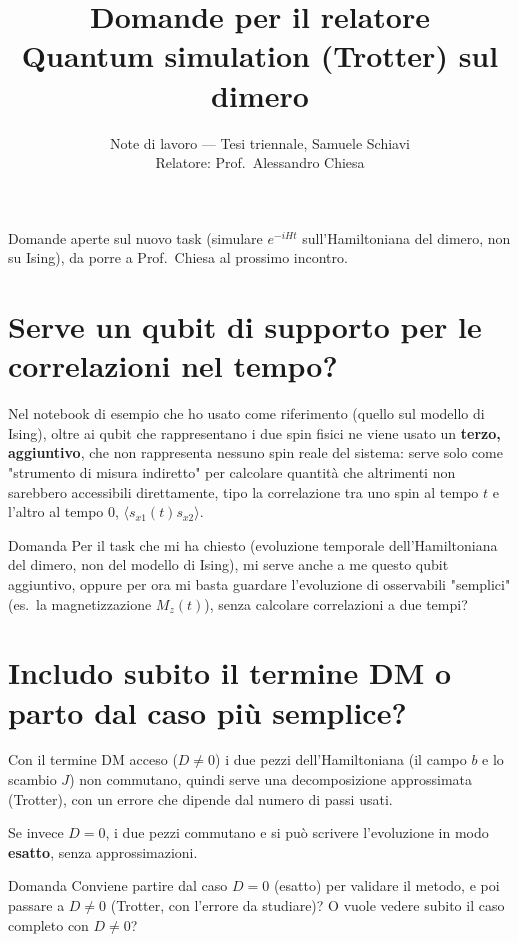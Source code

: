 \documentclass[11pt,a4paper]{article}
\title{\vspace{-1.5em}\color{inkblue}Domande per il relatore\\[0.1em]\Large\normalfont\color{softgray}Quantum simulation (Trotter) sul dimero}
\author{Note di lavoro --- Tesi triennale, Samuele Schiavi\\ Relatore: Prof.\ Alessandro Chiesa}
\date{}
\begin{document}
\sloppy
\maketitle
\thispagestyle{fancy}
\vspace{-2em}

Domande aperte sul nuovo task (simulare $e^{-iHt}$ sull'Hamiltoniana
del dimero, non su Ising), da porre a Prof.\ Chiesa al prossimo
incontro.

\section{Serve un qubit di supporto per le correlazioni nel tempo?}

Nel notebook di esempio che ho usato come riferimento (quello sul
modello di Ising), oltre ai qubit che rappresentano i due spin fisici
ne viene usato un \textbf{terzo, aggiuntivo}, che non rappresenta
nessuno spin reale del sistema: serve solo come "strumento di misura
indiretto" per calcolare quantità che altrimenti non sarebbero
accessibili direttamente, tipo la correlazione tra uno spin al tempo
$t$ e l'altro al tempo $0$, $\langle s_{x1}(t)s_{x2}\rangle$.

\begin{advisorbox}{Domanda}
Per il task che mi ha chiesto (evoluzione temporale dell'Hamiltoniana
del dimero, non del modello di Ising), mi serve anche a me questo
qubit aggiuntivo, oppure per ora mi basta guardare l'evoluzione di
osservabili "semplici" (es.\ la magnetizzazione $M_z(t)$), senza
calcolare correlazioni a due tempi?
\end{advisorbox}

\section{Includo subito il termine DM o parto dal caso più semplice?}

Con il termine DM acceso ($D\neq0$) i due pezzi dell'Hamiltoniana (il
campo $b$ e lo scambio $J$) non commutano, quindi serve una
decomposizione approssimata (Trotter), con un errore che dipende dal
numero di passi usati.

Se invece $D=0$, i due pezzi commutano e si può scrivere l'evoluzione
in modo \textbf{esatto}, senza approssimazioni.

\begin{advisorbox}{Domanda}
Conviene partire dal caso $D=0$ (esatto) per validare il metodo, e poi
passare a $D\neq0$ (Trotter, con l'errore da studiare)? O vuole vedere
subito il caso completo con $D\neq0$?
\end{advisorbox}
\end{document}
